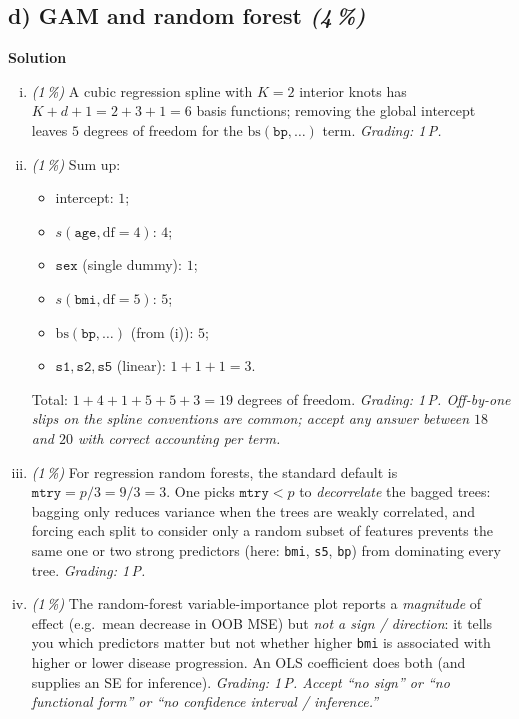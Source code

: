 \documentclass[11pt,a4paper]{article}
\newcommand{\subpoints}[1]{\textit{(#1\,\%)}}
\newcommand{\sol}{\noindent\textbf{Solution}}
\begin{document}
\subsection*{d) GAM and random forest \subpoints{4}}
\sol{}
\begin{enumerate}[(i)]
  \item \subpoints{1} A cubic regression spline with $K = 2$ interior knots has
        $K + d + 1 = 2 + 3 + 1 = 6$ basis functions; removing the global intercept leaves
        $\boxed{5}$ degrees of freedom for the $\mathrm{bs}(\texttt{bp},\dots)$ term.
        \emph{Grading: 1\,P.}

  \item \subpoints{1} Sum up:
        \begin{itemize}
          \item intercept: $1$;
          \item $s(\texttt{age}, \mathrm{df}=4)$: $4$;
          \item $\texttt{sex}$ (single dummy): $1$;
          \item $s(\texttt{bmi}, \mathrm{df}=5)$: $5$;
          \item $\mathrm{bs}(\texttt{bp}, \dots)$ (from (i)): $5$;
          \item $\texttt{s1}, \texttt{s2}, \texttt{s5}$ (linear): $1 + 1 + 1 = 3$.
        \end{itemize}
        Total: $1 + 4 + 1 + 5 + 5 + 3 = \boxed{19}$ degrees of freedom.
        \emph{Grading: 1\,P. Off-by-one slips on the spline conventions are common; accept
        any answer between $18$ and $20$ with correct accounting per term.}

  \item \subpoints{1} For regression random forests, the standard default is $\texttt{mtry} = p/3
        = 9/3 = \boxed{3}$. One picks $\texttt{mtry} < p$ to \emph{decorrelate} the bagged trees:
        bagging only reduces variance when the trees are weakly correlated, and forcing each
        split to consider only a random subset of features prevents the same one or two strong
        predictors (here: \texttt{bmi}, \texttt{s5}, \texttt{bp}) from dominating every tree.
        \emph{Grading: 1\,P.}

  \item \subpoints{1} The random-forest variable-importance plot reports a \emph{magnitude}
        of effect (e.g.\ mean decrease in OOB MSE) but \emph{not a sign / direction}: it tells
        you which predictors matter but not whether higher \texttt{bmi} is associated with
        higher or lower disease progression. An OLS coefficient does both (and supplies an SE
        for inference).
        \emph{Grading: 1\,P. Accept ``no sign'' or ``no functional form'' or ``no confidence
        interval / inference.''}
\end{enumerate}
\end{document}
